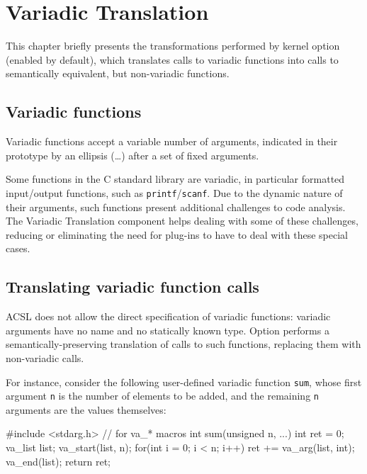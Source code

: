
\chapter{Variadic Translation}
\label{user-variadic}

This chapter briefly presents the transformations performed by kernel
option  (enabled by default), which
translates calls to variadic functions into calls to
semantically equivalent, but non-variadic functions.

\section*{Variadic functions}

Variadic functions accept a variable number of arguments, indicated in
their prototype by an ellipsis (\ldots) after a set of fixed arguments.

Some functions in the C standard library are variadic, in particular
formatted input/output functions, such as \texttt{printf}/\texttt{scanf}.
Due to the dynamic nature of their arguments, such functions present additional
challenges to code analysis. The Variadic Translation component helps
dealing with some
of these challenges, reducing or eliminating the need for plug-ins to have
to deal with these special cases.

\section{Translating variadic function calls}

ACSL does not allow the direct specification of variadic functions: variadic
arguments have no name and no statically known type.
Option 
performs a semantically-preserving translation of calls to such
functions, replacing them with non-variadic calls.

For instance, consider the following user-defined variadic function \verb+sum+,
whose first argument \verb+n+ is the number of elements to be added, and the
remaining \verb+n+ arguments are the values themselves:

\begin{ccode}
#include <stdarg.h> // for va_* macros
int sum(unsigned n, ...) {
  int ret = 0;
  va_list list;
  va_start(list, n);
  for(int i = 0; i < n; i++){
    ret += va_arg(list, int);
  }
  va_end(list);
  return ret;
}
\end{ccode}

